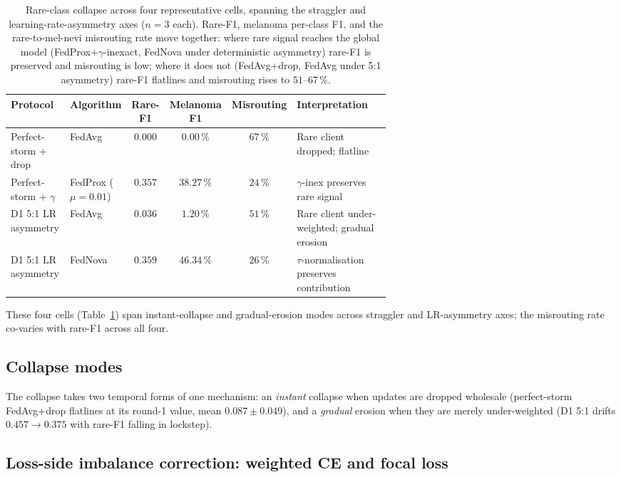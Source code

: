 \documentclass[11pt,a4paper]{report}
\begin{document}
\begin{table}[H]
\centering
\small
\caption{Rare-class collapse across four representative cells, spanning the
straggler and learning-rate-asymmetry axes ($n=3$ each). Rare-F1, melanoma
per-class F1, and the rare-to-mel-nevi misrouting rate move together: where
rare signal reaches the global model (FedProx+$\gamma$-inexact, FedNova under
deterministic asymmetry) rare-F1 is preserved and misrouting is low; where it
does not (FedAvg+drop, FedAvg under 5:1 asymmetry) rare-F1 flatlines and
misrouting rises to $51$--$67\,\%$.}
\label{tab:collapse-cells}
\begin{tabular}{p{0.16\linewidth} p{0.14\linewidth} c c c p{0.32\linewidth}}
\hline
Protocol                  & Algorithm & Rare-F1 & Melanoma F1 & Misrouting & Interpretation \\
\hline
Perfect-storm + drop      & FedAvg    & $0.000$ & $0.00\,\%$  & $67\,\%$   & Rare client dropped; flatline \\
Perfect-storm + $\gamma$  & FedProx ($\mu=0.01$) & $0.357$ & $38.27\,\%$ & $24\,\%$ & $\gamma$-inex preserves rare signal \\
D1 5:1 LR asymmetry       & FedAvg    & $0.036$ & $1.20\,\%$  & $51\,\%$   & Rare client under-weighted; gradual erosion \\
D1 5:1 LR asymmetry       & FedNova   & $0.359$ & $46.34\,\%$ & $26\,\%$   & $\tau$-normalisation preserves contribution \\
\hline
\end{tabular}
\end{table}

\noindent
These four cells (Table~\ref{tab:collapse-cells}) span instant-collapse and
gradual-erosion modes across straggler and LR-asymmetry axes; the misrouting
rate co-varies with rare-F1 across all four.


\subsection{Collapse modes}

The collapse takes two temporal forms of one mechanism: an \emph{instant}
collapse when updates are dropped wholesale (perfect-storm FedAvg+drop flatlines
at its round-1 value, mean $0.087 \pm 0.049$), and a \emph{gradual} erosion when
they are merely under-weighted (D1 5:1 drifts $0.457 \to 0.375$ with rare-F1
falling in lockstep).


\subsection{Loss-side imbalance correction: weighted CE and
focal loss}
\end{document}
